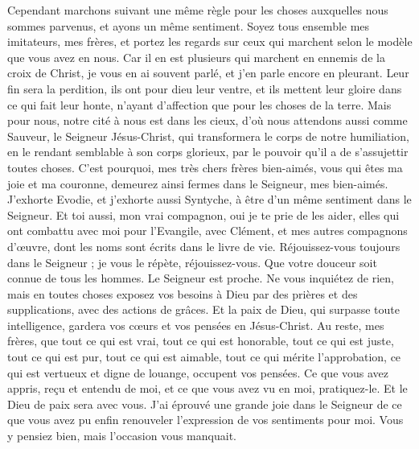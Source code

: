 \begin{multicols}{2}
Cependant marchons suivant une même règle pour les choses auxquelles nous sommes parvenus, et ayons un même sentiment.
Soyez tous ensemble mes imitateurs, mes frères, et portez les regards sur ceux qui marchent selon le modèle que vous avez en nous.
Car il en est plusieurs qui marchent en ennemis de la croix de Christ, je vous en ai souvent parlé, et j’en parle encore en pleurant.
Leur fin sera la perdition, ils ont pour dieu leur ventre, et ils mettent leur gloire dans ce qui fait leur honte, n'ayant d'affection que pour les choses de la terre.
Mais pour nous, notre cité à nous est dans les cieux, d'où nous attendons aussi comme Sauveur, le Seigneur Jésus-Christ,
qui transformera le corps de notre humiliation, en le rendant semblable à son corps glorieux, par le pouvoir qu’il a de s’assujettir toutes choses.
\VerseOne{}C'est pourquoi, mes très chers frères bien-aimés, vous qui êtes ma joie et ma couronne, demeurez ainsi fermes dans le Seigneur, mes bien-aimés.
J’exhorte Evodie, et j’exhorte aussi Syntyche, à être d’un même sentiment dans le Seigneur.
Et toi aussi, mon vrai compagnon, oui je te prie de les aider, elles qui ont combattu avec moi pour l'Evangile, avec Clément, et mes autres compagnons d’œuvre, dont les noms sont écrits dans le livre de vie.
Réjouissez-vous toujours dans le Seigneur ; je vous le répète, réjouissez-vous.
Que votre douceur soit connue de tous les hommes. Le Seigneur est proche.
Ne vous inquiétez de rien, mais en toutes choses exposez vos besoins à Dieu par des prières et des supplications, avec des actions de grâces.
Et la paix de Dieu, qui surpasse toute intelligence, gardera vos cœurs et vos pensées en Jésus-Christ.
Au reste, mes frères, que tout ce qui est vrai, tout ce qui est honorable, tout ce qui est juste, tout ce qui est pur, tout ce qui est aimable, tout ce qui mérite l’approbation, ce qui est vertueux et digne de louange, occupent vos pensées.
Ce que vous avez appris, reçu et entendu de moi, et ce que vous avez vu en moi, pratiquez-le. Et le Dieu de paix sera avec vous.
J’ai éprouvé une grande joie dans le Seigneur de ce que vous avez pu enfin renouveler l’expression de vos sentiments pour moi. Vous y pensiez bien, mais l’occasion vous manquait.

\end{multicols}
